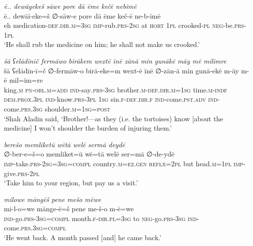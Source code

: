 \ea \label{DG.66}
\textit{ē.. dewāyekeš sāwe pore dā ēme kečē nebīmē} \\ 
\gll ē.. dewāī-eke=š ∅-sāw-e pore dā ēme keč-ē ne-b-īmē \\ 
 eh medication\textsc{-def}\textsc{.dir}\textsc{.m}\textsc{=3sg} \textsc{imp-}rub\textsc{.prs}-\textsc{2sg} at \textsc{hort} \textsc{1pl} crooked\textsc{\textsc{-pl}} \textsc{neg-}be\textsc{.prs}-\textsc{1pl} \\ 
\glt `He shall rub the medicine on him; he shall not make us crooked.'
\z 
 
\ea \label{DG.67}
\textit{šā ʕelādīnīč fermāwo birākem wextē īnē zānā min gunākē māy mē milimre} \\ 
\gll šā ʕelādīn-ī=č ∅-fermāw-o birā-eke=m wext-ē īnē ∅-zān-ā min gunā-ekē m-āy m-ē mil=im=re \\ 
 king\textsc{.m} \textsc{pn}\textsc{-obl}\textsc{.m}\textsc{=add} \textsc{ind-}say\textsc{.prs}\textsc{-3sg} brother\textsc{.m}\textsc{-def}\textsc{.dir}\textsc{.m}\textsc{=1sg} time\textsc{.m}\textsc{-indf} \textsc{dem.prox}\textsc{.3pl} \textsc{ind-}know\textsc{.prs}\textsc{-3pl} \textsc{1sg} sin\textsc{\textsc{.f}}\textsc{-def}\textsc{.dir}\textsc{\textsc{.f}} \textsc{ind-}come\textsc{.pst}\textsc{.adv} \textsc{ind-}come\textsc{.prs}\textsc{.3sg} shoulder\textsc{.m}\textsc{=1sg}\textsc{=\textsc{post}} \\ 
\glt `Shah Aladin said, ‘Brother!—as they (i.e. the tortoises) know [about the medicine] I won’t shoulder the burden of injuring them.'
\z 
 
\ea \label{DG.68}
\textit{berešo memliketū wētā welē sermā deydē} \\ 
\gll ∅-ber-e=š=o memliket=ū wē=tā welē ser=mā ∅-de-ydē \\ 
 \textsc{imp-}take\textsc{.prs}-\textsc{2sg}\textsc{=3sg}\textsc{=\textsc{compl}} country\textsc{.m}\textsc{=ez}\textsc{.gen} \textsc{reflx}\textsc{=2pl} but head\textsc{.m}\textsc{=1pl} \textsc{imp-}give\textsc{.prs}\textsc{-2pl} \\ 
\glt `Take him to your region, but pay us a visit.'
\z 
 
\ea \label{DG.69}
\textit{milowe māngēš pene mešo mēwe} \\ 
\gll mi-l-o=we mānge-ē=š pene me-š-o m-ē=we \\ 
 \textsc{ind-}go\textsc{.prs}\textsc{-3sg}\textsc{=\textsc{compl}} month\textsc{\textsc{.f}}\textsc{-dir}\textsc{.pl}\textsc{=3sg} to \textsc{neg-}go\textsc{.prs}\textsc{-3sg} \textsc{ind-}come\textsc{.prs}\textsc{.3sg}\textsc{=compl} \\ 
\glt `He went back. A month passed [and] he came back.'
\z 
 
